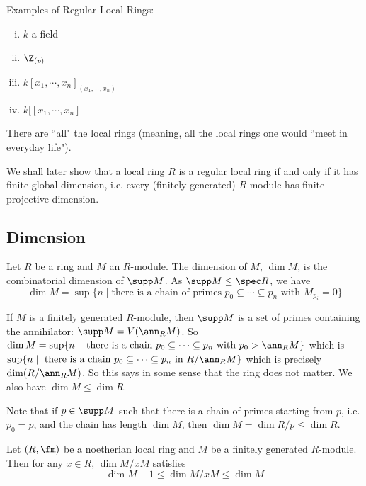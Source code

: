 \begin{ex} Examples of Regular Local Rings:
\begin{enumerate}[(i)]
\item $k$ a field
\item $\Z_{(p)}$
\item $k[x_1,\cdots,x_n]_{(x_1,\cdots,x_n)}$
\item $k[[x_1,\cdots,x_n]$
\end{enumerate}
There are ``all" the local rings (meaning, all the local rings one would ``meet in everyday life"). 
\end{ex}

We shall later show that a local ring $R$ is a regular local ring if and only if it has finite global dimension, i.e. every (finitely generated) $R$-module has finite projective dimension. 

\subsection{Dimension}

\begin{dfn}[Support]
Let $R$ be a ring and $M$ an $R$-module. The dimension of $M$, $\dim M$, is the combinatorial dimension of $\supp M$. As $\supp M \leq \spec R$, we have
\[
\dim M=\sup \{n\;|\; \text{there is a chain of primes }p_0 \subseteq \cdots \subseteq p_n \text{ with }M_{p_i}=0\}
\]
\end{dfn}

\begin{rem}
If $M$ is a finitely generated $R$-module, then $\supp M$ is a set of primes containing the annihilator:  $\supp M=V(\ann_R M)$. So $\dim M=\sup\{n\;|\; \text{ there is a chain } p_0 \subseteq \cdots \subseteq p_n  \text{ with }p_0>\ann_R M\}$ which is $\sup\{n\;|\; \text{ there is a chain } p_0 \subseteq \cdots \subseteq p_n  \text{ in }R/\ann_R M\}$ which is precisely $\dim(R/\ann_R M)$. So this says in some sense that the ring does not matter. We also have $\dim M \leq \dim R$.
\end{rem}

Note that if $p \in \supp M$ such that there is a chain of primes starting from $p$, i.e. $p_0=p$, and the chain has length $\dim M$, then $\dim M=\dim R/p \leq \dim R$. 

\begin{prop}
Let $(R,\fm)$ be a noetherian local ring and $M$ be a finitely generated $R$-module. Then for any $x \in R$, $\dim M/xM$ satisfies 
\[
\dim M-1 \leq \dim M/xM \leq \dim M
\]
\end{prop}

